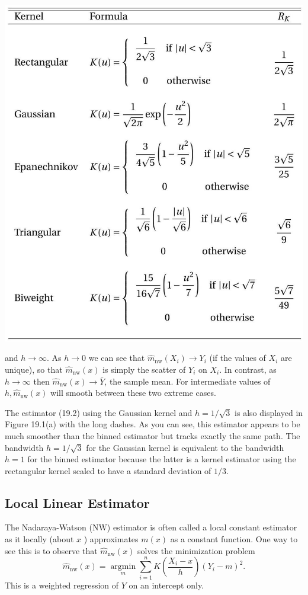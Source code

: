 \documentclass[10pt]{article}
\begin{document}
\includegraphics[max width=\textwidth]{2022_10_23_027876b875523fa3ea56g-04}

and $h \rightarrow \infty$. As $h \rightarrow 0$ we can see that $\widehat{m}_{\mathrm{nw}}\left(X_{i}\right) \rightarrow Y_{i}$ (if the values of $X_{i}$ are unique), so that $\widehat{m}_{\mathrm{nw}}(x)$ is simply the scatter of $Y_{i}$ on $X_{i}$. In contrast, as $h \rightarrow \infty$ then $\widehat{m}_{\mathrm{nw}}(x) \rightarrow \bar{Y}$, the sample mean. For intermediate values of $h, \widehat{m}_{\mathrm{nw}}(x)$ will smooth between these two extreme cases.

The estimator (19.2) using the Gaussian kernel and $h=1 / \sqrt{3}$ is also displayed in Figure 19.1(a) with the long dashes. As you can see, this estimator appears to be much smoother than the binned estimator but tracks exactly the same path. The bandwidth $h=1 / \sqrt{3}$ for the Gaussian kernel is equivalent to the bandwidth $h=1$ for the binned estimator because the latter is a kernel estimator using the rectangular kernel scaled to have a standard deviation of $1 / 3$.

\subsection{Local Linear Estimator}
The Nadaraya-Watson (NW) estimator is often called a local constant estimator as it locally (about $x$ ) approximates $m(x)$ as a constant function. One way to see this is to observe that $\widehat{m}_{\mathrm{nw}}(x)$ solves the minimization problem
$$
\widehat{m}_{\mathrm{nw}}(x)=\underset{m}{\operatorname{argmin}} \sum_{i=1}^{n} K\left(\frac{X_{i}-x}{h}\right)\left(Y_{i}-m\right)^{2} .
$$
This is a weighted regression of $Y$ on an intercept only.
\end{document}

